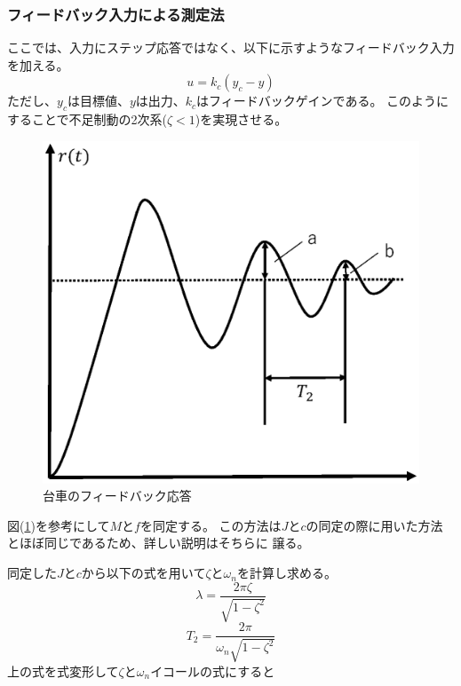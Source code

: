 	\subsubsection{フィードバック入力による測定法}
		ここでは、入力にステップ応答ではなく、以下に示すようなフィードバック入力を加える。
		\begin{equation}
			u = k_{c}(y_{c} - y)
		\end{equation}
		ただし、$y_c$は目標値、$y$は出力、$k_{c}$はフィードバックゲインである。
		このようにすることで不足制動の2次系($\zeta<1$)を実現させる。
		\begin{figure}[H]
			\centering
			\includegraphics[width=1.0\linewidth]{gazo/feedback.eps}
			\caption{台車のフィードバック応答}
			\label{image:parameterMFfeed}
		\end{figure}
		図(\ref{image:parameterMFfeed})を参考にして$M$と$f$を同定する。
		この方法は$J$と$c$の同定の際に用いた方法とほぼ同じであるため、詳しい説明はそちらに
		譲る。
		\par
		同定した$J$と$c$から以下の式を用いて$\zeta$と$\omega_{n}$を計算し求める。
		\begin{equation}
			\lambda=\frac{2\pi\zeta}{\sqrt{1-\zeta^{2}}}
		\end{equation}
		\begin{equation}
			T_{2}=\frac{2\pi}{\omega_{n}\sqrt{1-\zeta^{2}}}
		\end{equation}
		上の式を式変形して$\zeta$と$\omega_{n}$イコールの式にすると
